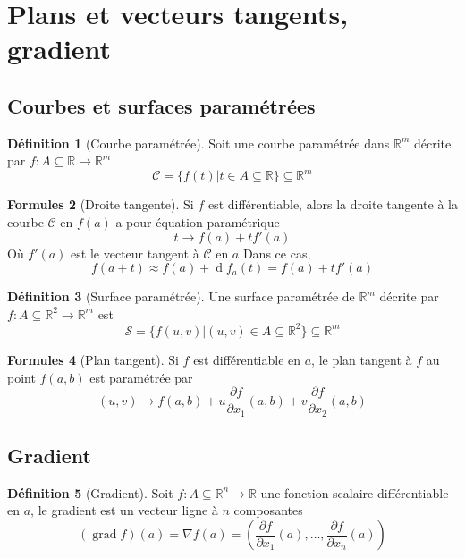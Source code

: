 \documentclass[11pt,a4paper]{article}
\theoremstyle{definition}
\newtheorem{mydef}{Définition}%
\newtheorem{myform}[mydef]{Formules}
\DeclareMathOperator{\newgrad}{grad}
\DeclareMathOperator{\diff}{d}
\newcommand{\dif}{\diff\!}
\newcommand{\pa}{\partial}
\newcommand{\R}{\mathbb{R}}
\begin{document}

\section{Plans et vecteurs tangents, gradient}

\subsection{Courbes et surfaces paramétrées}

\begin{mydef}[Courbe paramétrée]
	Soit une courbe paramétrée dans $\R^m$ décrite par $f : A \subseteq \R \to \R^m$
	\[ \mathcal{C} = \{ f(t) | t \in A \subseteq \R \} \subseteq \R^m \]
\end{mydef}

\begin{myform}[Droite tangente]
	Si $f$ est différentiable, alors la droite tangente à la courbe $\mathcal{C}$ en $f(a)$ a pour équation paramétrique
	\[ t \to f(a) + t f'(a) \]
	Où $f'(a)$ est le vecteur tangent à $\mathcal{C}$ en $a$
	Dans ce cas,
	\[ f(a + t) \approx f(a) + \dif f_a(t) = f(a) + t f'(a) \]
\end{myform}

\begin{mydef}[Surface paramétrée]
	Une surface paramétrée de $\R^m$ décrite par $f : A \subseteq \R^2 \to \R^m$ est
	\[ \mathcal{S} = \{ f(u,v) | (u,v) \in A \subseteq \R^2 \} \subseteq \R^m \]
\end{mydef}

\begin{myform}[Plan tangent]
	Si $f$ est différentiable en $a$, le plan tangent à $f$ au point $f(a,b)$ est paramétrée par
	\[ (u,v) \to f(a,b) + u \frac{\pa f}{\pa x_1} (a,b) + v \frac{\pa f}{\pa x_2}(a,b) \]
\end{myform}

\subsection{Gradient}

\begin{mydef}[Gradient] Soit $f : A \subseteq \R^n \to \R$ une fonction scalaire différentiable en $a$, le gradient est un vecteur ligne à $n$ composantes
	\[ (\newgrad f)(a) = \nabla f(a) = \left( \frac{\pa f}{\pa x_1}(a) , \dots, \frac{\pa f}{\pa x_n}(a) \right) \]
\end{mydef}
\end{document}
